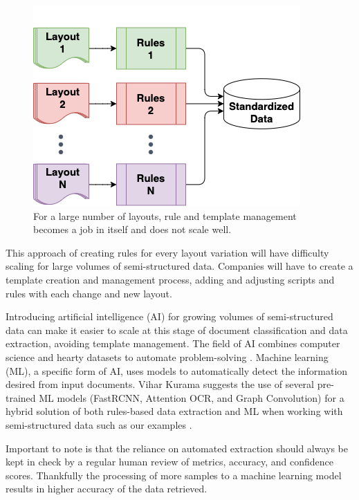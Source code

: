 \documentclass[conference]{IEEEtran}
\begin{document}
\begin{figure}[ht]
\centerline{\includegraphics[width=\columnwidth]{RulesFlowN.png}}
\caption{For a large number of layouts, rule and template management becomes a job in itself and does not scale well.}
\label{figRulesFlow3}
\end{figure}

This approach of creating rules for every layout variation will have difficulty scaling for large volumes of semi-structured data. Companies will have to create a template creation and management process, adding and adjusting scripts and rules with each change and new layout.

Introducing artificial intelligence (AI) for growing volumes of semi-structured data can make it easier to scale at this stage of document classification and data extraction, avoiding template management. The field of AI combines computer science and hearty datasets to automate problem-solving \cite{ibm:ai}. Machine learning (ML), a specific form of AI, uses models to automatically detect the information desired from input documents. Vihar Kurama suggests the use of several pre-trained ML models (FastRCNN, Attention OCR, and Graph Convolution) for a hybrid solution of both rules-based data extraction and ML when working with semi-structured data such as our examples \cite{kurama2021a}.

Important to note is that the reliance on automated extraction should always be kept in check by a regular human review of metrics, accuracy, and confidence scores. Thankfully the processing of more samples to a machine learning model results in higher accuracy of the data retrieved.
\end{document}
